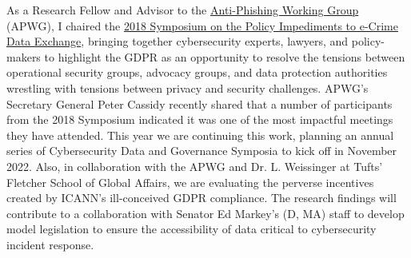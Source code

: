 \documentclass[11pt]{letter}
\begin{document}
\begin{letter}
%
%
As a Research Fellow and Advisor to the \href{https://apwg.org}{Anti-Phishing Working Group} (APWG), I chaired the \href{https://apwg.org/2018-symposium-on-policy-impediments-to-cybercrime-data-exchange/}{2018 Symposium on the Policy Impediments to e-Crime Data Exchange}, bringing together cybersecurity experts,
lawyers, and policy-makers to highlight the GDPR as an opportunity to resolve the tensions between operational security groups, advocacy groups, and data protection authorities wrestling with tensions between privacy and security challenges.
%
APWG's Secretary General Peter Cassidy recently shared that a number of participants from the 2018 Symposium indicated it was one of the most impactful meetings they have attended.
%
This year we are continuing this work, planning an annual series of Cybersecurity Data and Governance Symposia to kick off in November 2022.
%
Also, in collaboration with the APWG and Dr. L. Weissinger at Tufts' Fletcher School of Global Affairs, we are evaluating the perverse incentives created by ICANN's ill-conceived GDPR compliance.
%
The research findings will contribute to a collaboration with Senator Ed Markey's (D, MA) staff to develop model legislation to ensure the accessibility of data critical to cybersecurity incident response. 


\end{letter}
\end{document}
